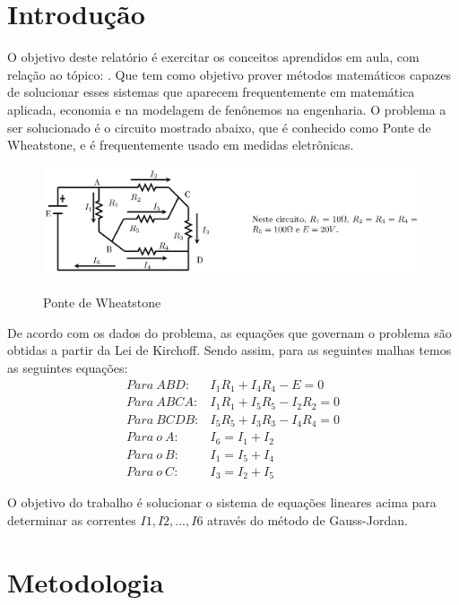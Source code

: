 \documentclass[12pt, hidelinks]{article}
\makeatletter
\let\thetitle\@title
\makeatother
\begin{document}
\section{Introdução}

O objetivo deste relatório é exercitar os conceitos aprendidos em aula, com relação ao tópico: \thetitle.
Que tem como objetivo prover métodos matemáticos capazes de solucionar esses sistemas que aparecem frequentemente
em matemática aplicada, economia e na modelagem de fenônemos na engenharia.
O problema a ser solucionado é o circuito mostrado abaixo, que é conhecido como Ponte de Wheatstone, e é frequentemente usado em medidas eletrônicas.

\begin{figure}[!h]
  \centering
  \includegraphics[width=15cm]{figuras/problema.png}\\
  \caption{Ponte de Wheatstone}\label{fig:ponte}
\end{figure}

De acordo com os dados do problema, as equações que governam o problema são obtidas a partir da Lei de Kirchoff.
Sendo assim, para as seguintes malhas temos as seguintes equações:
\begin{eqnarray}\label{eq:sistema}
  Para~ABD: & I_1R_1+I_4R_4-E=0 \nonumber\\
  Para~ABCA: & I_1R_1+I_5R_5-I_2R_2=0 \nonumber\\
  Para~BCDB: & I_5R_5+I_3R_3-I_4R_4=0 \nonumber\\
  Para~o~A: & I_6=I_1+I_2 \nonumber\\
  Para~o~B: & I_1=I_5+I_4 \nonumber\\
  Para~o~C: & I_3=I_2+I_5
\end{eqnarray}

O objetivo do trabalho é solucionar o sistema de equações lineares acima para determinar as correntes
$I1, I2,...,I6$ através do método de Gauss-Jordan.

\section{Metodologia}
\end{document}
